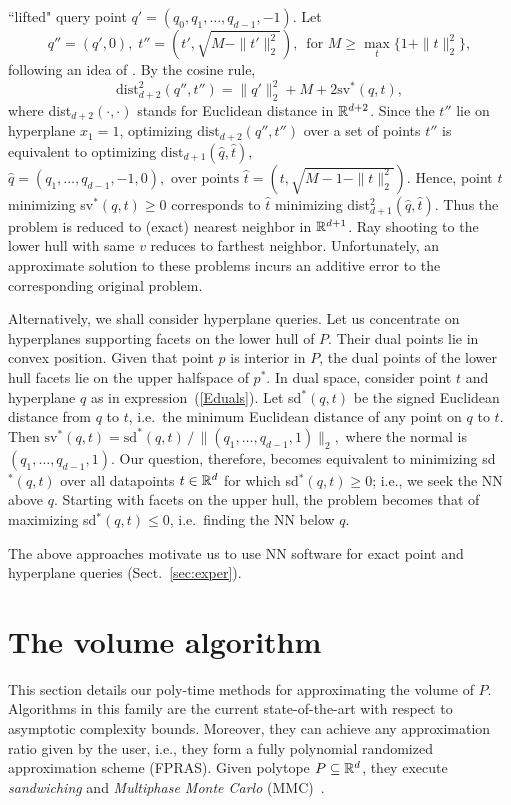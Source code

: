 \documentclass[11pt,a4paper]{article}
\def\qh{{\hat q}} \def\th{{\hat t}}
\begin{document}
``lifted" query point $q' =(q_0,q_1,\dots ,q_{d-1} , -1)$.
Let 
$$
q'' =(q',0), \; t'' =(t',\sqrt{M-\|t'\|_2^2}), \, \mbox{ for }
M\ge \max_t \{ 1 + \|t\|_2^2 \} ,
$$
following an idea of \cite{BasriHZM11}. By the cosine rule, 
$$
\mbox{dist}_{d+2}^2 (q'',t'') = \| q' \|_2^2 + M + 2 \mbox{sv}^*(q,t) , 
$$
where dist$_{d+2}(\cdot,\cdot)$ stands for Euclidean distance in ${\mathbb R}^{d+2}$.
Since the $t''$ lie on hyperplane $x_1=1$, optimizing
$\mbox{dist}_{d+2}(q'',t'')$ over a set of points $t''$ is equivalent to optimizing
$ \mbox{dist}_{d+1}(\qh,\th)$, $\qh=(q_1,\dots,q_{d-1},-1,0),
\mbox{ over points } \th=(t,\sqrt{M-1-\|t\|_2^2}).$ 
Hence, point $t$ 
minimizing sv$^*(q,t) \ge 0$ corresponds to $\th$
minimizing dist$_{d+1}^2 (\qh,\th)$. 
Thus the problem is reduced to (exact) nearest neighbor in ${\mathbb R}^{d+1}$.
Ray shooting to the lower hull with same $v$ reduces to 
farthest neighbor. 
Unfortunately, an approximate solution to these problems incurs
an additive error to the corresponding original problem.  

Alternatively, we shall consider hyperplane queries.
Let us concentrate on hyperplanes supporting facets on the lower 
hull of $P$.  Their dual points lie in convex position.
Given that point $p$ is interior in $P$, the dual points
of the lower hull facets lie on the upper halfspace of $p^*$.
In dual space, consider point $t$ and hyperplane $q$ as in expression~(\ref{Eduals}).
Let sd$^*(q,t)$ be the signed Euclidean distance from $q$ to $t$, i.e.\
the minimum Euclidean distance of any point on $q$ to $t$.
Then
$
\mbox{sv}^*(q, t) = \mbox{sd}^*(q,t)\, / \, \| (q_1,\dots ,q_{d-1} , 1) \|_2 ,
$
where the normal is $(q_1,\dots ,q_{d-1} , 1)$.
Our question, therefore, becomes equivalent to 
minimizing sd$^*(q,t)$ over all datapoints $t\in{\mathbb R}^d$ for which
sd$^*(q,t)\ge 0$; i.e., we seek the NN above $q$.
Starting with facets on the upper hull, the problem becomes that of
maximizing sd$^*(q,t)\le 0$, i.e.\ finding the NN below $q$.

The above approaches motivate us to use NN software for exact 
point and hyperplane queries (Sect.~\ref{sec:exper}).
 

\section{The volume algorithm}\label{sec:vol}

This section details our poly-time methods for approximating the volume of $P$.
Algorithms in this family are the current state-of-the-art with
respect to asymptotic complexity bounds.
Moreover, they can achieve any approximation ratio given by the user,
i.e., they form a fully polynomial randomized approximation scheme (FPRAS).
Given polytope $P\subseteq{\mathbb R}^d$, they execute 
{\it sandwiching} and {\it Multiphase Monte Carlo} (MMC)~\cite{Simonovits03}. 
\end{document}
